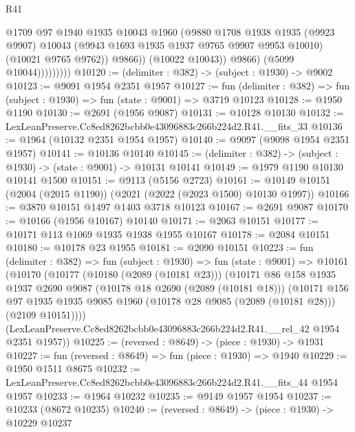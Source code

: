 \begin{lexlean}{R41}
\begin{coremodule}
                            @1709
                            @97
                            @1940
                            @1935
                            @10043
                            @1960
                            (@9880
                              @1708
                              @1938
                              @1935
                              (@9923 @9907)
                              @10043
                              (@9943 @1693 @1935 @1937 @9765 @9907 @9953 @10010)
                              (@10021 @9765 @9762))
                            @9866))
                        (@10022 @10043))
                      @9866)
                    (@5099 @10044)))))))))
@10120 := (delimiter : @382) -> (subject : @1930) -> @9002
@10123 := @9091 @1954 @2351 @1957
@10127 := fun (delimiter : @382) => fun (subject : @1930) => fun (state : @9001) => @3719 @10123
@10128 := @1950 @1190
@10130 := @2691 (@1956 @9087)
@10131 := @10128 @10130
@10132 := LexLeanPreserve.Cc8ed8262bcbb0e43096883c266b224d2.R41.__fits_33
@10136 := @1964 (@10132 @2351 @1954 @1957)
@10140 := @9097 (@9098 @1954 @2351 @1957)
@10141 := @10136 @10140
@10145 := (delimiter : @382) -> (subject : @1930) -> (state : @9001) -> @10131 @10141
@10149 := @1979 @1190 @10130 @10141 @1500
@10151 := @9113 (@5156 @2723)
@10161 := @10149 @10151 (@2004 (@2015 @1190)) (@2021 (@2022 (@2023 @1500) @10130 @1997))
@10166 := @3870 @10151 @1497 @1403 @3718 @10123
@10167 := @2691 @9087
@10170 := @10166 (@1956 @10167) @10140
@10171 := @2063 @10151
@10177 := @10171 @113 @1069 @1935 @1938 @1955 @10167
@10178 := @2084 @10151
@10180 := @10178 @23 @1955
@10181 := @2090 @10151
@10223 := fun (delimiter : @382) =>
  fun (subject : @1930) =>
  fun (state : @9001) =>
  @10161
    (@10170
      (@10177
        (@10180 (@2089 (@10181 @23)))
        (@10171
          @86
          @158
          @1935
          @1937
          @2690
          @9087
          (@10178 @18 @2690 (@2089 (@10181 @18)))
          (@10171
            @156
            @97
            @1935
            @1935
            @9085
            @1960
            (@10178 @28 @9085 (@2089 (@10181 @28)))
            (@2109 @10151))))
      (LexLeanPreserve.Cc8ed8262bcbb0e43096883c266b224d2.R41.__rel_42 @1954 @2351 @1957))
@10225 := (reversed : @8649) -> (piece : @1930) -> @1931
@10227 := fun (reversed : @8649) => fun (piece : @1930) => @1940
@10229 := @1950 @1511 @8675
@10232 := LexLeanPreserve.Cc8ed8262bcbb0e43096883c266b224d2.R41.__fits_44 @1954 @1957
@10233 := @1964 @10232
@10235 := @9149 @1957 @1954
@10237 := @10233 (@8672 @10235)
@10240 := (reversed : @8649) -> (piece : @1930) -> @10229 @10237

\end{coremodule}
\end{lexlean}
